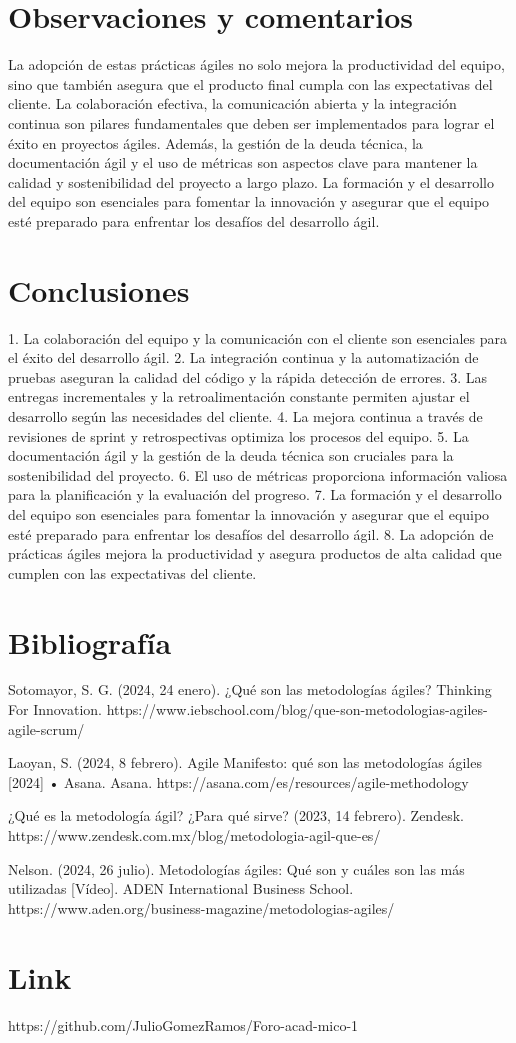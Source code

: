 \documentclass[12pt]{article}
\begin{document}
\section*{Observaciones y comentarios}
La adopción de estas prácticas ágiles no solo mejora la productividad del equipo, sino que también asegura que el producto final cumpla con las expectativas del cliente. La colaboración efectiva, la comunicación abierta y la integración continua son pilares fundamentales que deben ser implementados para lograr el éxito en proyectos ágiles. Además, la gestión de la deuda técnica, la documentación ágil y el uso de métricas son aspectos clave para mantener la calidad y sostenibilidad del proyecto a largo plazo. La formación y el desarrollo del equipo son esenciales para fomentar la innovación y asegurar que el equipo esté preparado para enfrentar los desafíos del desarrollo ágil.

\section*{Conclusiones}
1. La colaboración del equipo y la comunicación con el cliente son esenciales para el éxito del desarrollo ágil.
2. La integración continua y la automatización de pruebas aseguran la calidad del código y la rápida detección de errores.
3. Las entregas incrementales y la retroalimentación constante permiten ajustar el desarrollo según las necesidades del cliente.
4. La mejora continua a través de revisiones de sprint y retrospectivas optimiza los procesos del equipo.
5. La documentación ágil y la gestión de la deuda técnica son cruciales para la sostenibilidad del proyecto.
6. El uso de métricas proporciona información valiosa para la planificación y la evaluación del progreso.
7. La formación y el desarrollo del equipo son esenciales para fomentar la innovación y asegurar que el equipo esté preparado para enfrentar los desafíos del desarrollo ágil.
8. La adopción de prácticas ágiles mejora la productividad y asegura productos de alta calidad que cumplen con las expectativas del cliente.

\section*{Bibliografía}
Sotomayor, S. G. (2024, 24 enero). ¿Qué son las metodologías ágiles? Thinking For Innovation. https://www.iebschool.com/blog/que-son-metodologias-agiles-agile-scrum/

Laoyan, S. (2024, 8 febrero). Agile Manifesto: qué son las metodologías ágiles [2024] • Asana. Asana. https://asana.com/es/resources/agile-methodology

¿Qué es la metodología ágil? ¿Para qué sirve? (2023, 14 febrero). Zendesk. https://www.zendesk.com.mx/blog/metodologia-agil-que-es/

Nelson. (2024, 26 julio). Metodologías ágiles: Qué son y cuáles son las más utilizadas [Vídeo]. ADEN International Business School. https://www.aden.org/business-magazine/metodologias-agiles/

\section*{Link} 
https://github.com/JulioGomezRamos/Foro-acad-mico-1
\end{document}
